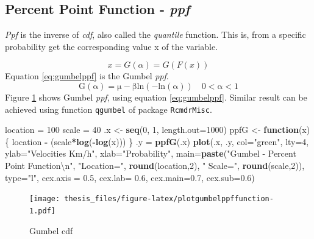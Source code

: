 \documentclass[12pt,twoside]{reedthesis}
\newenvironment{Shaded}{\begin{snugshade}}{\end{snugshade}}
\newcommand{\CharTok}[1]{\textcolor[rgb]{0.31,0.60,0.02}{#1}}
\newcommand{\ControlFlowTok}[1]{\textcolor[rgb]{0.13,0.29,0.53}{\textbf{#1}}}
\newcommand{\DataTypeTok}[1]{\textcolor[rgb]{0.13,0.29,0.53}{#1}}
\newcommand{\DecValTok}[1]{\textcolor[rgb]{0.00,0.00,0.81}{#1}}
\newcommand{\FloatTok}[1]{\textcolor[rgb]{0.00,0.00,0.81}{#1}}
\newcommand{\KeywordTok}[1]{\textcolor[rgb]{0.13,0.29,0.53}{\textbf{#1}}}
\newcommand{\NormalTok}[1]{#1}
\newcommand{\OperatorTok}[1]{\textcolor[rgb]{0.81,0.36,0.00}{\textbf{#1}}}
\newcommand{\StringTok}[1]{\textcolor[rgb]{0.31,0.60,0.02}{#1}}
\begin{document}
\hypertarget{percent-point-function---ppf}{%
\subsection{\texorpdfstring{Percent Point Function - \emph{ppf}}{Percent Point Function - ppf}}\label{percent-point-function---ppf}}

\emph{Ppf} is the inverse of \emph{cdf}, also called the \emph{quantile} function. This is, from a specific probability get the corresponding value x of the variable.

\[
x = G(\alpha) = G(F(x))
\]
Equation \eqref{eq:gumbelppf} is the Gumbel \emph{ppf}.
\begin{equation}
\mathrm{
        G(\alpha) = \mu-\beta ln(-ln(\alpha))
        \quad 0 < \alpha < 1
        }
  \label{eq:gumbelppf}
\end{equation}
Figure \ref{fig:plotgumbelppffunction} shows Gumbel \emph{ppf}, using equation \eqref{eq:gumbelppf}. Similar result can be achieved using function \texttt{qgumbel} of package \texttt{RcmdrMisc}.

\footnotesize
\begin{Shaded}
\begin{Highlighting}[]
\NormalTok{location =}\StringTok{ }\DecValTok{100}
\NormalTok{scale =}\StringTok{ }\DecValTok{40}
\NormalTok{.x <-}\StringTok{ }\KeywordTok{seq}\NormalTok{(}\DecValTok{0}\NormalTok{, }\DecValTok{1}\NormalTok{, }\DataTypeTok{length.out=}\DecValTok{1000}\NormalTok{)}
\NormalTok{ppfG <-}\StringTok{ }\ControlFlowTok{function}\NormalTok{(x) \{}
\NormalTok{  location }\OperatorTok{-}\StringTok{ }\NormalTok{(scale}\OperatorTok{*}\KeywordTok{log}\NormalTok{(}\OperatorTok{-}\KeywordTok{log}\NormalTok{(x)))}
\NormalTok{  \}}
\NormalTok{.y =}\StringTok{ }\KeywordTok{ppfG}\NormalTok{(.x)}
\KeywordTok{plot}\NormalTok{(.x, .y, }\DataTypeTok{col=}\StringTok{"green"}\NormalTok{, }\DataTypeTok{lty=}\DecValTok{4}\NormalTok{, }
     \DataTypeTok{ylab=}\StringTok{"Velocities Km/h"}\NormalTok{, }\DataTypeTok{xlab=}\StringTok{"Probability"}\NormalTok{, }
     \DataTypeTok{main=}\KeywordTok{paste}\NormalTok{(}\StringTok{"Gumbel - Percent Point Function}\CharTok{\textbackslash{}n}\StringTok{"}\NormalTok{, }\StringTok{"Location="}\NormalTok{, }
     \KeywordTok{round}\NormalTok{(location,}\DecValTok{2}\NormalTok{), }\StringTok{" Scale="}\NormalTok{, }\KeywordTok{round}\NormalTok{(scale,}\DecValTok{2}\NormalTok{)), }\DataTypeTok{type=}\StringTok{"l"}\NormalTok{, }
     \DataTypeTok{cex.axis =} \FloatTok{0.5}\NormalTok{, }\DataTypeTok{cex.lab=} \FloatTok{0.6}\NormalTok{, }\DataTypeTok{cex.main=}\FloatTok{0.7}\NormalTok{, }\DataTypeTok{cex.sub=}\FloatTok{0.6}\NormalTok{)}
\end{Highlighting}
\end{Shaded}
\begin{figure}
\centering
\texttt{[image: thesis\_files/figure-latex/plotgumbelppffunction-1.pdf]}
\caption{\label{fig:plotgumbelppffunction}Gumbel cdf}
\end{figure}
\normalsize
\end{document}
